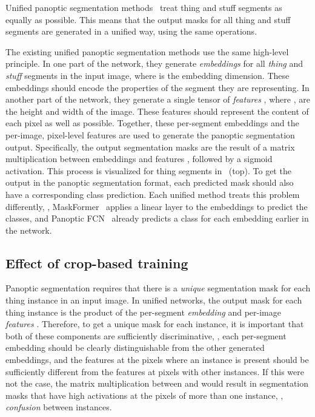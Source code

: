 \documentclass[10pt,twocolumn,letterpaper]{article}
\begin{document}
Unified panoptic segmentation methods~\cite{cheng2021mask2former,cheng2021maskformer,li2021panopticfcn,wang2021maxdeeplab,zhang2021knet} treat thing and stuff segments as equally as possible. This means that the output masks for all thing and stuff segments are generated in a unified way, using the same operations. 

The existing unified panoptic segmentation methods use the same high-level principle. In one part of the network, they generate \textit{embeddings}  for all  \textit{thing} and \textit{stuff} segments in the input image, where  is the embedding dimension. These embeddings should encode the properties of the segment they are representing. In another part of the network, they generate a single tensor of \textit{features} , where ,  are the height and width of the image. These features should represent the content of each pixel as well as possible. Together, these per-segment embeddings and the per-image, pixel-level features are used to generate the panoptic segmentation output. Specifically, the output segmentation masks  are the result of a matrix multiplication between embeddings  and features , followed by a sigmoid activation. This process is visualized for thing segments in~ (top). To get the output in the panoptic segmentation format, each predicted mask should also have a corresponding class prediction. Each unified method treats this problem differently, \eg, MaskFormer~\cite{cheng2021maskformer} applies a linear layer to the embeddings to predict the classes, and Panoptic FCN~\cite{li2021panopticfcn} already predicts a class for each embedding earlier in the network.

\subsection{Effect of crop-based training}
\label{sec:problem_description:crop_training}
Panoptic segmentation requires that there is a \textit{unique} segmentation mask for each thing instance in an input image. In unified networks, the output mask for each thing instance is the product of the per-segment \textit{embedding}  and per-image \textit{features} . Therefore, to get a unique mask for each instance, it is important that both of these components are sufficiently discriminative, \ie, each per-segment embedding should be clearly distinguishable from the other generated embeddings, and the features at the pixels where an instance is present should be sufficiently different from the features at pixels with other instances. If this were not the case, the matrix multiplication between  and  would result in segmentation masks that have high activations at the pixels of more than one instance, \ie, \textit{confusion} between instances.
\end{document}
